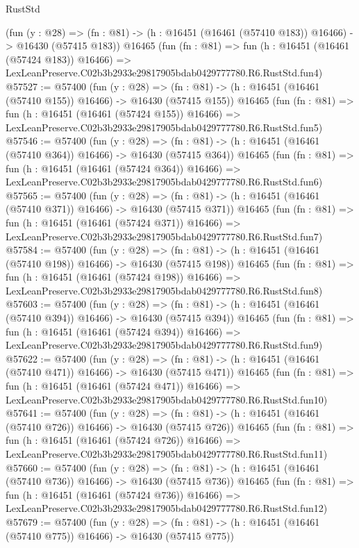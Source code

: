 \begin{lexlean}{RustStd}
\begin{coremodule}
    (fun (y : @28) =>
    (fn : @81) -> (h : @16451 (@16461 (@57410 @183)) @16466) -> @16430 (@57415 @183))
    @16465
    (fun (fn : @81) =>
    fun (h : @16451 (@16461 (@57424 @183)) @16466) =>
    LexLeanPreserve.C02b3b2933e29817905bdab0429777780.R6.RustStd.fun4)
@57527 := @57400
    (fun (y : @28) =>
    (fn : @81) -> (h : @16451 (@16461 (@57410 @155)) @16466) -> @16430 (@57415 @155))
    @16465
    (fun (fn : @81) =>
    fun (h : @16451 (@16461 (@57424 @155)) @16466) =>
    LexLeanPreserve.C02b3b2933e29817905bdab0429777780.R6.RustStd.fun5)
@57546 := @57400
    (fun (y : @28) =>
    (fn : @81) -> (h : @16451 (@16461 (@57410 @364)) @16466) -> @16430 (@57415 @364))
    @16465
    (fun (fn : @81) =>
    fun (h : @16451 (@16461 (@57424 @364)) @16466) =>
    LexLeanPreserve.C02b3b2933e29817905bdab0429777780.R6.RustStd.fun6)
@57565 := @57400
    (fun (y : @28) =>
    (fn : @81) -> (h : @16451 (@16461 (@57410 @371)) @16466) -> @16430 (@57415 @371))
    @16465
    (fun (fn : @81) =>
    fun (h : @16451 (@16461 (@57424 @371)) @16466) =>
    LexLeanPreserve.C02b3b2933e29817905bdab0429777780.R6.RustStd.fun7)
@57584 := @57400
    (fun (y : @28) =>
    (fn : @81) -> (h : @16451 (@16461 (@57410 @198)) @16466) -> @16430 (@57415 @198))
    @16465
    (fun (fn : @81) =>
    fun (h : @16451 (@16461 (@57424 @198)) @16466) =>
    LexLeanPreserve.C02b3b2933e29817905bdab0429777780.R6.RustStd.fun8)
@57603 := @57400
    (fun (y : @28) =>
    (fn : @81) -> (h : @16451 (@16461 (@57410 @394)) @16466) -> @16430 (@57415 @394))
    @16465
    (fun (fn : @81) =>
    fun (h : @16451 (@16461 (@57424 @394)) @16466) =>
    LexLeanPreserve.C02b3b2933e29817905bdab0429777780.R6.RustStd.fun9)
@57622 := @57400
    (fun (y : @28) =>
    (fn : @81) -> (h : @16451 (@16461 (@57410 @471)) @16466) -> @16430 (@57415 @471))
    @16465
    (fun (fn : @81) =>
    fun (h : @16451 (@16461 (@57424 @471)) @16466) =>
    LexLeanPreserve.C02b3b2933e29817905bdab0429777780.R6.RustStd.fun10)
@57641 := @57400
    (fun (y : @28) =>
    (fn : @81) -> (h : @16451 (@16461 (@57410 @726)) @16466) -> @16430 (@57415 @726))
    @16465
    (fun (fn : @81) =>
    fun (h : @16451 (@16461 (@57424 @726)) @16466) =>
    LexLeanPreserve.C02b3b2933e29817905bdab0429777780.R6.RustStd.fun11)
@57660 := @57400
    (fun (y : @28) =>
    (fn : @81) -> (h : @16451 (@16461 (@57410 @736)) @16466) -> @16430 (@57415 @736))
    @16465
    (fun (fn : @81) =>
    fun (h : @16451 (@16461 (@57424 @736)) @16466) =>
    LexLeanPreserve.C02b3b2933e29817905bdab0429777780.R6.RustStd.fun12)
@57679 := @57400
    (fun (y : @28) =>
    (fn : @81) -> (h : @16451 (@16461 (@57410 @775)) @16466) -> @16430 (@57415 @775))

\end{coremodule}
\end{lexlean}

